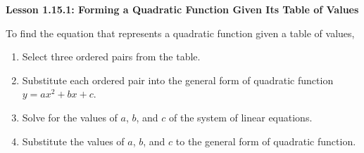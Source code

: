 \begin{center}
\textbf{Lesson 1.15.1: Forming  a Quadratic Function Given Its Table of Values}
\end{center}

\vspace*{1ex}

To find the equation that represents a quadratic function given a table of values, 
\begin{enumerate}[label = \color{blue}\arabic*. ]
\item Select three ordered pairs from the table. 
\item Substitute each ordered pair into the general form of quadratic function $y = ax^{2}+bx+c$. 
\item Solve for the values of $a$, $b$, and $c$ of the system of linear equations. 
\item Substitute the values of $a$, $b$, and $c$ to the general form of quadratic function.

\end{enumerate}


 